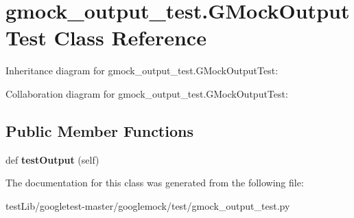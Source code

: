 \hypertarget{classgmock__output__test_1_1GMockOutputTest}{}\section{gmock\+\_\+output\+\_\+test.\+G\+Mock\+Output\+Test Class Reference}
\label{classgmock__output__test_1_1GMockOutputTest}


Inheritance diagram for gmock\+\_\+output\+\_\+test.\+G\+Mock\+Output\+Test\+:


Collaboration diagram for gmock\+\_\+output\+\_\+test.\+G\+Mock\+Output\+Test\+:
\subsection*{Public Member Functions}
\begin{DoxyCompactItemize}
\item 
\mbox{\label{classgmock__output__test_1_1GMockOutputTest_a661e7846690f48328fd9e0834fde9980}} 
def {\bfseries test\+Output} (self)
\end{DoxyCompactItemize}


The documentation for this class was generated from the following file\+:\begin{DoxyCompactItemize}
\item 
test\+Lib/googletest-\/master/googlemock/test/gmock\+\_\+output\+\_\+test.\+py\end{DoxyCompactItemize}
